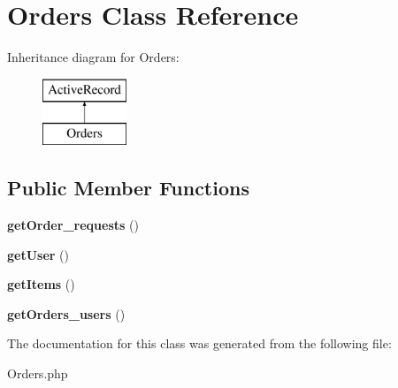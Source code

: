 \hypertarget{classapp_1_1models_1_1_orders}{}\section{Orders Class Reference}
\label{classapp_1_1models_1_1_orders}
Inheritance diagram for Orders\+:\begin{figure}[H]
\begin{center}
\leavevmode
\includegraphics[height=2.000000cm]{classapp_1_1models_1_1_orders}
\end{center}
\end{figure}
\subsection*{Public Member Functions}
\begin{DoxyCompactItemize}
\item 
\hypertarget{classapp_1_1models_1_1_orders_a56ab3af6588561bfc165a1bb56983821}{}\label{classapp_1_1models_1_1_orders_a56ab3af6588561bfc165a1bb56983821} 
{\bfseries get\+Order\+\_\+requests} ()
\item 
\hypertarget{classapp_1_1models_1_1_orders_ae81b7186fb97a7c6457edcc68c9aa2ef}{}\label{classapp_1_1models_1_1_orders_ae81b7186fb97a7c6457edcc68c9aa2ef} 
{\bfseries get\+User} ()
\item 
\hypertarget{classapp_1_1models_1_1_orders_ab20ac3660e2d867b235b004bd3950ec3}{}\label{classapp_1_1models_1_1_orders_ab20ac3660e2d867b235b004bd3950ec3} 
{\bfseries get\+Items} ()
\item 
\hypertarget{classapp_1_1models_1_1_orders_a55b0fb55c00827c478acf035fd1a2ca0}{}\label{classapp_1_1models_1_1_orders_a55b0fb55c00827c478acf035fd1a2ca0} 
{\bfseries get\+Orders\+\_\+users} ()
\end{DoxyCompactItemize}


The documentation for this class was generated from the following file\+:\begin{DoxyCompactItemize}
\item 
Orders.\+php\end{DoxyCompactItemize}
